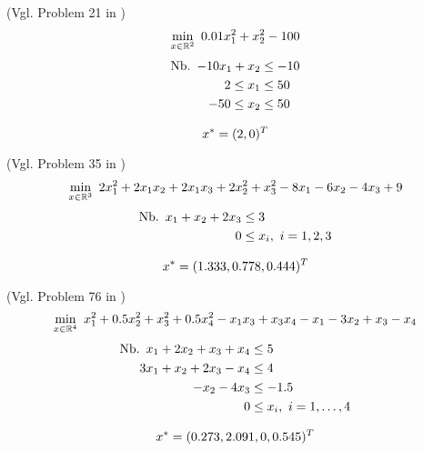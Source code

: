 \begin{testproblem}
(Vgl. Problem 21 in \cite[S.~44]{hock})
\begin{equation}
\min_{x\in\mathbb{R}^2}\ 0.01 x_1^2 + x_2^2 - 100
\end{equation}
\begin{equation*}
\begin{split}
\nb -10 x_1 + x_2 & \leq -10 \\
2 \leq x_1 & \leq 50 \\
-50 \leq x_2 & \leq 50 \\
\end{split}
\end{equation*}

\begin{equation*}
x^* = (2, 0)^T
\end{equation*}
\end{testproblem}

\begin{testproblem}
(Vgl. Problem 35 in \cite[S.~58]{hock})
\begin{equation}
\min_{x\in\mathbb{R}^3}\ 2 x_1^2 + 2 x_1 x_2 + 2 x_1 x_3 + 2 x_2^2 + x_3^2 - 8 x_1 - 6 x_2 - 4 x_3 + 9
\end{equation}
\begin{equation*}
\begin{split}
\nb x_1 + x_2 + 2 x_3 & \leq 3 \\
0 & \leq x_i,\ i = 1,2,3 \\
\end{split}
\end{equation*}

\begin{equation*}
x^* = (1.333, 0.778, 0.444)^T
\end{equation*}
\end{testproblem}

\begin{testproblem}
(Vgl. Problem 76 in \cite[S.~96]{hock})
\begin{equation}
\min_{x\in\mathbb{R}^4}\ x_1^2 + 0.5 x_2^2 + x_3^2 + 0.5 x_4^2 - x_1 x_3 + x_3 x_4 - x_1 - 3 x_2 + x_3 - x_4
\end{equation}
\begin{equation*}
\begin{split}
\nb x_1 + 2 x_2 + x_3 + x_4 & \leq 5 \\
3 x_1 + x_2 + 2 x_3 - x_4 & \leq 4 \\
-x_2 - 4 x_3 & \leq -1.5 \\
0 & \leq x_i,\ i = 1,\ldots,4 \\
\end{split}
\end{equation*}

\begin{equation*}
x^* = (0.273, 2.091, 0, 0.545)^T
\end{equation*}
\end{testproblem}
